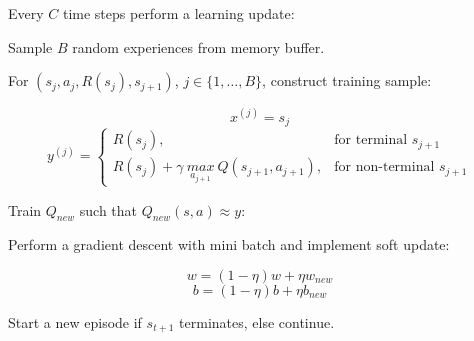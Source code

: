 \documentclass{article}
\begin{document}
\hspace{1cm} Every \(C\) time steps perform a learning update:

\hspace{1cm} Sample \(B\) random experiences from memory buffer.

\hspace{1cm} For \((s_{j}, a_{j}, R(s_{j}), s_{j+1})\), \(j \in \{1, \dots, B\}\), construct training sample:

\[x^{(j)} = s_{j}\]
\[
y^{(j)} =
\begin{cases}
  R(s_{j}), & \text{for terminal } s_{j+1} \\
  R(s_{j}) + \gamma \ \underset{a_{j+1}}{max} \ Q(s_{j+1}, a_{j+1}), & \text{for non-terminal } s_{j+1}
\end{cases}
\]

\hspace{1cm} Train \(Q_{new}\) such that \(Q_{new}(s, a) \approx y\):

\hspace{1cm} Perform a gradient descent with mini batch and implement soft update:

\[w = (1 - \eta)w + \eta w_{new}\]
\[b = (1 - \eta)b + \eta b_{new}\]

\hspace{1cm} Start a new episode if \(s_{t+1}\) terminates, else continue.

\printindex
\end{document}
